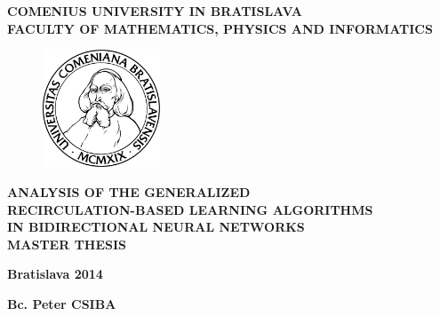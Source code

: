 \begin{center}
    \large{
        \textbf{
            COMENIUS UNIVERSITY IN BRATISLAVA \\ 
            FACULTY OF MATHEMATICS, PHYSICS AND INFORMATICS
        }
    }
\end{center}

\vspace{2cm}

\begin{figure}[!h]
    \centering
    \includegraphics[width=3.5cm]{img/komlogo-new.pdf}
\end{figure}

\vspace{1cm}

\begin{center}
    \large{
        \textbf{
            ANALYSIS OF THE GENERALIZED \\
            RECIRCULATION-BASED LEARNING ALGORITHMS \\
            IN BIDIRECTIONAL NEURAL NETWORKS \\
            \vspace{3cm}
            MASTER THESIS
        }
    }
\end{center}

\vfill

\begin{multicols}{2}
    \begin{flushleft}
        \textbf{Bratislava 2014}
    \end{flushleft}
    \begin{flushright}
        \textbf{Bc. Peter CSIBA}
    \end{flushright}
\end{multicols}

